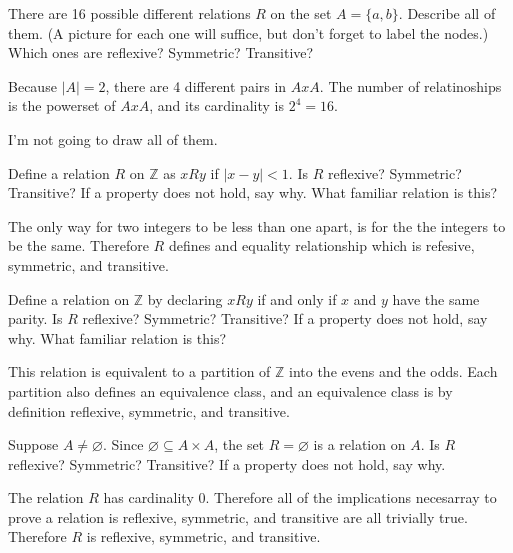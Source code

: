 \documentclass{article}
\begin{document}
\begin{exercise}{}{}{There are 16 possible different relations $R$ on the set
		$A=\{a, b\}$. Describe all of them. (A picture for each one will suffice,
		but don't forget to label the nodes.) Which ones are reflexive? Symmetric?
		Transitive?}
	\tcblower
	\begin{alist}
		\item Because $|A|=2$, there are 4 different pairs in $AxA$. The number of
		relatinoships is the powerset of $AxA$, and its cardinality is $2^4=16$.
		\item I'm not going to draw all of them.
	\end{alist}
\end{exercise}{}{}

\begin{exercise}{}{}{Define a relation $R$ on $\mathbb{Z}$ as $x R y$ if
		$|x-y|<1$. Is $R$ reflexive? Symmetric? Transitive? If a property does not
		hold, say why. What familiar relation is this?}
	\tcblower
	\begin{alist}
		\item The only way for two integers to be less
		than one apart, is for the the integers to be the same. Therefore $R$
		defines and equality relationship which is refesive, symmetric, and transitive.
	\end{alist}
\end{exercise}{}{}

\begin{exercise}{}{}{Define a relation on $\mathbb{Z}$ by declaring $x R y$
		if and only if $x$ and $y$ have the same parity. Is $R$ reflexive?
		Symmetric? Transitive? If a property does not hold, say why. What familiar
		relation is this?}
	\tcblower
	\begin{alist}
		\item This relation is equivalent to a partition of $\mathbb{Z}$ into the evens
		and the odds.  Each partition also defines an equivalence class, and an
		equivalence class is by definition reflexive, symmetric, and transitive.
	\end{alist}
\end{exercise}{}{}

\begin{exercise}{}{}{Suppose $A \neq \varnothing$. Since $\varnothing
			\subseteq A \times A$, the set $R=\varnothing$ is a relation on $A$. Is $R$
		reflexive? Symmetric? Transitive? If a property does not hold, say why.}
	\tcblower
	\begin{alist}
		\item The relation $R$ has cardinality 0. Therefore all of the implications
		necesarray to prove a relation is reflexive, symmetric, and transitive are
		all trivially true. Therefore $R$ is reflexive, symmetric, and transitive.
	\end{alist}
\end{exercise}{}{}
\end{document}
